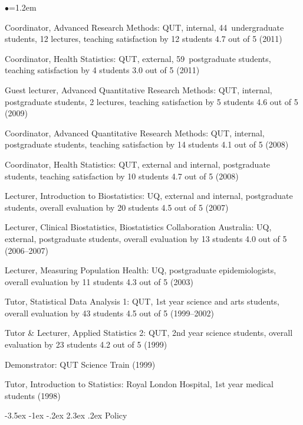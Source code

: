 \documentclass[a4paper,11pt]{article}
\makeatletter
\renewcommand\section{\@startsection {section}{1}{\z@}%
                                   {-3.5ex \@plus -1ex \@minus -.2ex}%
                                   {2.3ex \@plus.2ex}%
                                   {\normalfont\large\bfseries\color{blue}}}
\renewcommand{\labelitemi}{$\bullet$}
\makeatother
\begin{document}
\begin{raggedright}
\begin{list}{\labelitemi}{\leftmargin=1.2em}\addtolength{\itemsep}{-0.5\baselineskip}
\item Coordinator, Advanced Research Methods: QUT, internal, 44~undergraduate
students, 12 lectures, teaching satisfaction by 12 students 4.7 out of 5 (2011)
\item Coordinator, Health Statistics: QUT, external, 59~postgraduate
students, teaching satisfaction by 4 students 3.0 out of 5 (2011)
\item Guest lecturer, Advanced Quantitative Research Methods: QUT, internal, postgraduate
students, 2 lectures, teaching satisfaction by 5 students 4.6 out of 5 (2009)
\item Coordinator, Advanced Quantitative Research Methods: QUT, internal, postgraduate
students, teaching satisfaction by 14 students 4.1 out of 5 (2008)
\item Coordinator, Health Statistics: QUT, external and internal, postgraduate students, teaching
satisfaction by 10 students 4.7 out of 5 (2008)
\item Lecturer, Introduction to Biostatistics: UQ, external and internal, postgraduate students,
overall evaluation by 20 students 4.5 out of 5 (2007)
\item Lecturer, Clinical Biostatistics, Biostatistics Collaboration Australia: UQ, external,
postgraduate students, overall evaluation by 13 students 4.0 out of 5 (2006--2007)
\item Lecturer, Measuring Population Health: UQ, postgraduate epidemiologists, overall evaluation
by 11 students 4.3 out of 5 (2003)
\item Tutor, Statistical Data Analysis 1: QUT, 1st year science and arts students, overall evaluation
by 43 students 4.5 out of 5 (1999--2002)
\item Tutor \& Lecturer, Applied Statistics 2: QUT, 2nd year science students, overall evaluation by
23 students 4.2 out of 5 (1999)
\item Demonstrator: QUT Science Train (1999)
\item Tutor, Introduction to Statistics: Royal London Hospital, 1st year medical students (1998)
\end{list}


\section{Policy}


\end{raggedright}
\end{document}
